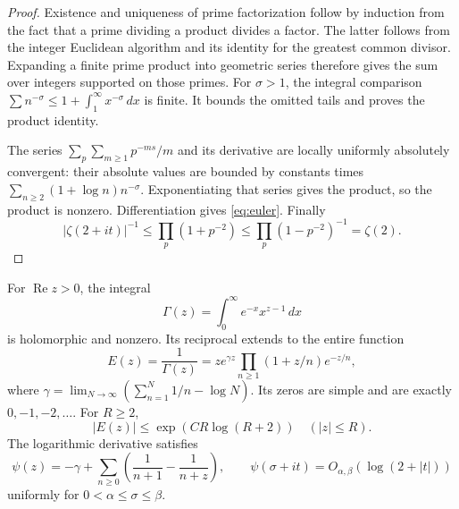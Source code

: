 \documentclass[11pt]{article}
\numberwithin{equation}{section}
\begin{document}
\begin{proof}
Existence and uniqueness of prime factorization follow by induction from
the fact that a prime dividing a product divides a factor.  The latter
follows from the integer Euclidean algorithm and its identity for the
greatest common divisor.
Expanding a finite prime product into geometric series therefore gives the
sum over integers supported on those primes.
For $\sigma>1$, the integral comparison
$\sum n^{-\sigma}\leq1+\int_1^\infty x^{-\sigma}\,dx$ is finite.
It bounds the omitted tails and proves the product identity.

The series
$\sum_p\sum_{m\geq1}p^{-ms}/m$ and its derivative are locally uniformly
absolutely convergent: their absolute values are bounded by constants times
$\sum_{n\geq2}(1+\log n)n^{-\sigma}$.
Exponentiating that series gives the product, so the product is nonzero.
Differentiation gives \eqref{eq:euler}.
Finally
\[
 |\zeta(2+it)|^{-1}
 \leq\prod_p(1+p^{-2})\leq\prod_p(1-p^{-2})^{-1}=\zeta(2).
\]
\end{proof}

\begin{lemma}
\label{lem:gamma}
For $\operatorname{Re}z>0$, the integral
\[
 \Gamma(z)=\int_0^\infty e^{-x}x^{z-1}\,dx
\]
is holomorphic and nonzero.  Its reciprocal extends to the entire function
\begin{equation}
 E(z)=\frac1{\Gamma(z)}
 =z e^{\gamma z}\prod_{n\geq1}(1+z/n)e^{-z/n},
 \label{eq:gamma-product}
\end{equation}
where $\gamma=\lim_{N\to\infty}(\sum_{n=1}^N1/n-\log N)$.
Its zeros are simple and are exactly $0,-1,-2,\ldots$.
For $R\geq2$,
\begin{equation}
 |E(z)|\leq\exp(CR\log(R+2))\quad(|z|\leq R).
 \label{eq:reciprocal-growth}
\end{equation}
The logarithmic derivative satisfies
\begin{equation}
 \psi(z)=-\gamma+\sum_{n\geq0}
           \left(\frac1{n+1}-\frac1{n+z}\right),
 \qquad
 \psi(\sigma+it)=O_{\alpha,\beta}(\log(2+|t|))
 \label{eq:digamma}
\end{equation}
uniformly for $0<\alpha\leq\sigma\leq\beta$.
\end{lemma}
\end{document}
